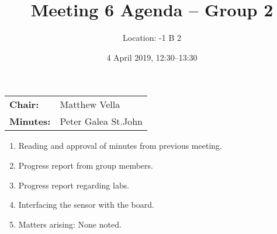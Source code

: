 \documentclass[11pt,a4paper]{article}
\title{Meeting 6 Agenda -- Group 2}
\author{Location: -1 B 2}
\date{4 April 2019, 12:30--13:30}
\begin{document}
\maketitle
\begin{center}
\begin{tabular}{ll}
\textbf{Chair:}   & Matthew Vella \\
\textbf{Minutes:} & Peter Galea St.John
\end{tabular}
\end{center}

\begin{enumerate}

\item Reading and approval of minutes from previous meeting.

\item Progress report from group members.

\item Progress report regarding labs.

\item Interfacing the sensor with the board. 

\item Matters arising: None noted.

\end{enumerate}
\end{document}
